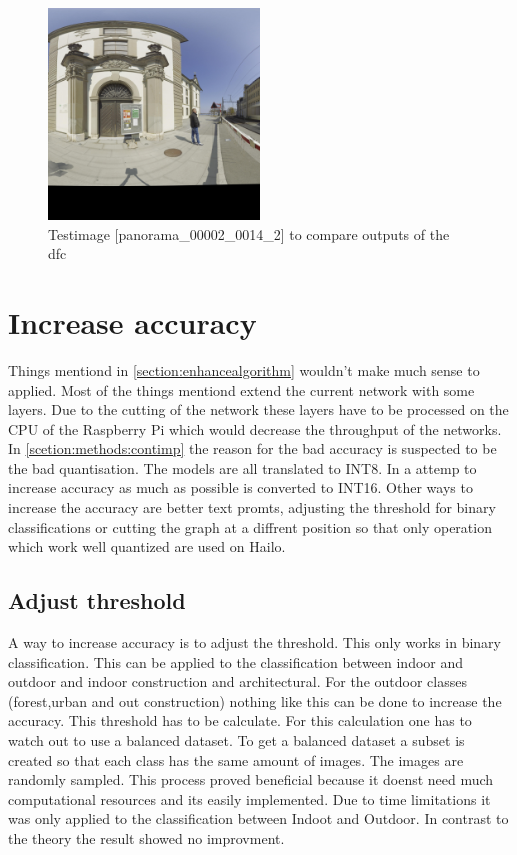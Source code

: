 \begin{figure}
    \centering
    \includegraphics[width=0.5\textwidth]{Images/Implementation/panorama_00002_0014_2_testIMg.jpg}
    \caption{Testimage [panorama\_00002\_0014\_2] to compare outputs of the \acrshort{dfc}}
    \label{methods:fig:comparetestpic}
\end{figure}

\section{Increase accuracy}

Things mentiond in \cref{section:enhancealgorithm} wouldn't make much sense to applied.
Most of the things mentiond extend the current network with some layers.
Due to the cutting of the network these layers have to be processed on the CPU of the Raspberry Pi which would decrease the throughput of the networks.
In \cref{scetion:methods:contimp} the reason for the bad accuracy is suspected to be the bad quantisation.
The models are all translated to INT8.
In a attemp to increase accuracy as much as possible is converted to INT16.
Other ways to increase the accuracy are better text promts, adjusting the threshold for binary classifications or cutting the graph at a diffrent position so that only operation which work well quantized are used on Hailo.

\subsection{Adjust threshold}

A way to increase accuracy is to adjust the threshold.
This only works in binary classification.
This can be applied to the classification between indoor and outdoor and indoor construction and architectural.
For the outdoor classes (forest,urban and out construction) nothing like this can be done to increase the accuracy.
This threshold has to be calculate.
For this calculation one has to watch out to use a balanced dataset.
To get a balanced dataset a subset is created so that each class has the same amount of images.
The images are randomly sampled.
This process proved beneficial because it doenst need much computational resources and its easily implemented.
Due to time limitations it was only applied to the classification between Indoot and Outdoor.
In contrast to the theory the result showed no improvment.

